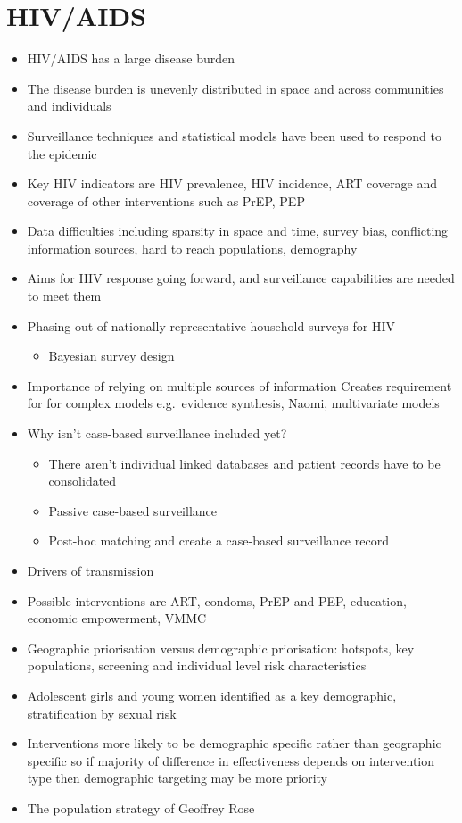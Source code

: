 \documentclass[a4paper, nobind]{templates/ociamthesis}
\providecommand{\tightlist}{%
  \setlength{\itemsep}{0pt}\setlength{\parskip}{0pt}}
\begin{document}
\hypertarget{hivaids}{%
\section{HIV/AIDS}\label{hivaids}}

\begin{itemize}
\tightlist
\item
  HIV/AIDS has a large disease burden
\item
  The disease burden is unevenly distributed in space and across communities and individuals
\item
  Surveillance techniques and statistical models have been used to respond to the epidemic
\item
  Key HIV indicators are HIV prevalence, HIV incidence, ART coverage and coverage of other interventions such as PrEP, PEP
\item
  Data difficulties including sparsity in space and time, survey bias, conflicting information sources, hard to reach populations, demography
\item
  Aims for HIV response going forward, and surveillance capabilities are needed to meet them
\item
  Phasing out of nationally-representative household surveys for HIV

  \begin{itemize}
  \tightlist
  \item
    Bayesian survey design
  \end{itemize}
\item
  Importance of relying on multiple sources of information
  Creates requirement for for complex models e.g.~evidence synthesis, Naomi, multivariate models
\item
  Why isn't case-based surveillance included yet?

  \begin{itemize}
  \tightlist
  \item
    There aren't individual linked databases and patient records have to be consolidated
  \item
    Passive case-based surveillance
  \item
    Post-hoc matching and create a case-based surveillance record
  \end{itemize}
\item
  Drivers of transmission
\item
  Possible interventions are ART, condoms, PrEP and PEP, education, economic empowerment, VMMC
\item
  Geographic priorisation versus demographic priorisation: hotspots, key populations, screening and individual level risk characteristics
\item
  Adolescent girls and young women identified as a key demographic, stratification by sexual risk
\item
  Interventions more likely to be demographic specific rather than geographic specific so if majority of difference in effectiveness depends on intervention type then demographic targeting may be more priority
\item
  The population strategy of Geoffrey Rose
\end{itemize}
\end{document}
